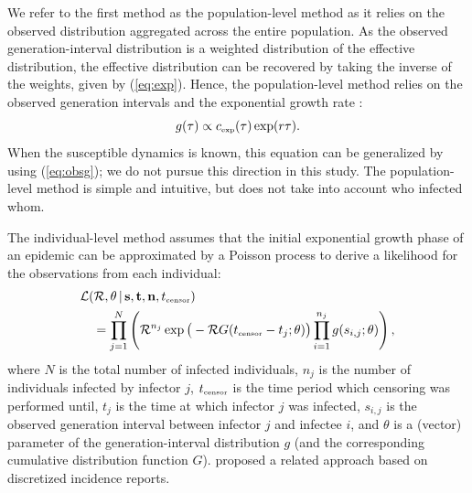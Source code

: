 \documentclass[12pt]{article}
\newcommand{\eref}[1]{(\ref{eq:#1})}
\newcommand{\RR}{\ensuremath{{\mathcal R}}}
\newcommand{\tsub}[2]{#1_{{\textrm{\tiny #2}}}}
\begin{document}
We refer to the first method as the population-level method as it relies on the observed distribution aggregated across the entire population.
As the observed generation-interval distribution is a weighted distribution of the effective distribution, the effective distribution can be recovered by taking the inverse of the weights, given by \eref{exp}.
Hence, the population-level method relies on the observed generation intervals and the exponential growth rate \citep{tomba2010some, nishiura2010time}:
\begin{equation}
g(\tau) \propto \tsub{c}{exp}(\tau) \exp(r\tau).
\end{equation}
When the susceptible dynamics is known, this equation can be generalized by using \eref{obsg}; we do not pursue this direction in this study.
The population-level method is simple and intuitive, but does not take into account who infected whom.

The individual-level method assumes that the initial exponential growth phase of an epidemic can be approximated by a Poisson process to derive a likelihood for the observations from each individual:
\begin{equation}
\begin{aligned}
&\mathcal{L}(\RR, \theta\,|\, \mathbf{s}, \mathbf{t}, \mathbf{n}, \tsub{t}{censor})\\
&\quad=\prod_{j=1}^N \left(\RR^{n_j} \exp \big(- \RR G(\tsub{t}{censor} - t_j ;\theta) \big) \prod_{i=1}^{n_j} g(s_{i, j}; \theta) \right),
\end{aligned}
\end{equation}
where $N$ is the total number of infected individuals, $n_j$ is the number of individuals infected by infector $j$, $\tsub{t}{censor}$ is the time period which censoring was performed until, $t_j$ is the time at which infector $j$ was infected, $s_{i,j}$ is the observed generation interval between infector $j$ and infectee $i$, and $\theta$ is a (vector) parameter of the generation-interval distribution $g$ (and the corresponding cumulative distribution function $G$).
\cite{forsberg2008likelihood} proposed a related approach based on discretized incidence reports.
\end{document}
